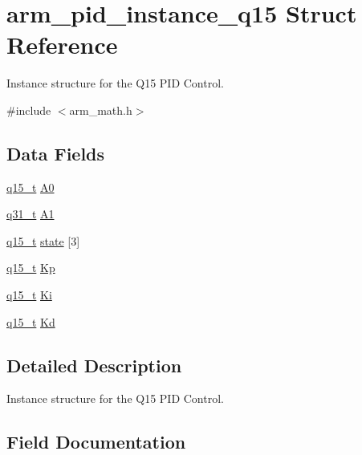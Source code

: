 \hypertarget{structarm__pid__instance__q15}{}\section{arm\+\_\+pid\+\_\+instance\+\_\+q15 Struct Reference}
\label{structarm__pid__instance__q15}


Instance structure for the Q15 P\+ID Control.  




{\ttfamily \#include $<$arm\+\_\+math.\+h$>$}

\subsection*{Data Fields}
\begin{DoxyCompactItemize}
\item 
\mbox{\hyperlink{arm__math_8h_ab5a8fb21a5b3b983d5f54f31614052ea}{q15\+\_\+t}} \mbox{\hyperlink{structarm__pid__instance__q15_a1aa73268c65cea0c7bc66bb70ff35205}{A0}}
\item 
\mbox{\hyperlink{arm__math_8h_adc89a3547f5324b7b3b95adec3806bc0}{q31\+\_\+t}} \mbox{\hyperlink{structarm__pid__instance__q15_aeb897c84724b56948e4222aca8d0e1f4}{A1}}
\item 
\mbox{\hyperlink{arm__math_8h_ab5a8fb21a5b3b983d5f54f31614052ea}{q15\+\_\+t}} \mbox{\hyperlink{structarm__pid__instance__q15_a4c4e19d77015f5f7a31a1daf0faf31b6}{state}} \mbox{[}3\mbox{]}
\item 
\mbox{\hyperlink{arm__math_8h_ab5a8fb21a5b3b983d5f54f31614052ea}{q15\+\_\+t}} \mbox{\hyperlink{structarm__pid__instance__q15_afef61fb3b64c73f2cd0c91d9dcf95679}{Kp}}
\item 
\mbox{\hyperlink{arm__math_8h_ab5a8fb21a5b3b983d5f54f31614052ea}{q15\+\_\+t}} \mbox{\hyperlink{structarm__pid__instance__q15_a19d5059baf06dd52266260d096702d0a}{Ki}}
\item 
\mbox{\hyperlink{arm__math_8h_ab5a8fb21a5b3b983d5f54f31614052ea}{q15\+\_\+t}} \mbox{\hyperlink{structarm__pid__instance__q15_abf38d18de1e16bc6d86846fedf8534fe}{Kd}}
\end{DoxyCompactItemize}


\subsection{Detailed Description}
Instance structure for the Q15 P\+ID Control. 

\subsection{Field Documentation}
\mbox{\label{structarm__pid__instance__q15_a1aa73268c65cea0c7bc66bb70ff35205}} 
